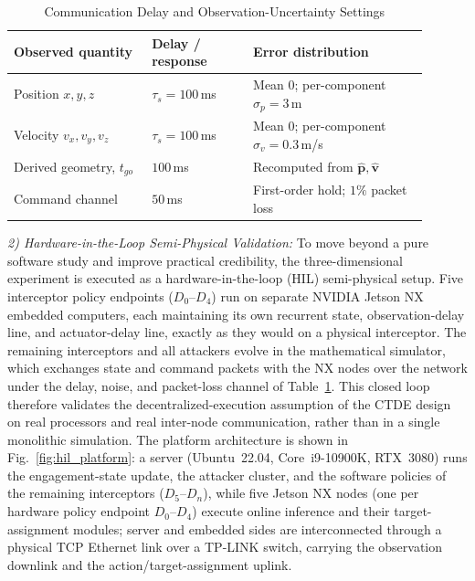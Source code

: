 \documentclass[lettersize,journal]{IEEEtran}
\newcommand{\hladd}[1]{{\color{blue}#1}}
\begin{document}
\begin{table}[!t]
\centering
\caption{\hladd{Communication Delay and Observation-Uncertainty Settings}}
\label{tab:uncertainty_settings}
\renewcommand{\arraystretch}{1.2}
\footnotesize
\begin{tabular}{@{}p{0.30\linewidth}p{0.22\linewidth}p{0.38\linewidth}@{}}
\hline\hline
{\color{blue}Observed quantity} & {\color{blue}Delay / response} & {\color{blue}Error distribution} \\
\hline
{\color{blue}Position $x,y,z$} & {\color{blue}$\tau_s=100$\,ms} & {\color{blue}Mean $0$; per-component $\sigma_p=3$\,m} \\
{\color{blue}Velocity $v_x,v_y,v_z$} & {\color{blue}$\tau_s=100$\,ms} & {\color{blue}Mean $0$; per-component $\sigma_v=0.3$\,m/s} \\
{\color{blue}Derived geometry, $t_{go}$} & {\color{blue}$100$\,ms} & {\color{blue}Recomputed from $\widehat{\mathbf{p}},\widehat{\mathbf{v}}$} \\
{\color{blue}Command channel} & {\color{blue}$50$\,ms} & {\color{blue}First-order hold; $1\%$ packet loss} \\
\hline\hline
\end{tabular}
\end{table}

\hladd{\emph{2) Hardware-in-the-Loop Semi-Physical Validation:} To move beyond a pure software
study and improve practical credibility, the three-dimensional experiment is executed as a
hardware-in-the-loop (HIL) semi-physical setup. Five interceptor policy endpoints ($D_0$--$D_4$)
run on separate NVIDIA Jetson NX embedded computers, each maintaining its own recurrent state,
observation-delay line, and actuator-delay line, exactly as they would on a physical
interceptor. The remaining interceptors and all attackers evolve in the mathematical simulator,
which exchanges state and command packets with the NX nodes over the network under the delay,
noise, and packet-loss channel of Table~\ref{tab:uncertainty_settings}. This closed loop
therefore validates the decentralized-execution assumption of the CTDE design on real
processors and real inter-node communication, rather than in a single monolithic simulation.
The platform architecture is shown in Fig.~\ref{fig:hil_platform}: a server (Ubuntu~22.04,
Core~i9-10900K, RTX~3080) runs the engagement-state update, the attacker cluster, and the
software policies of the remaining interceptors ($D_5$--$D_n$), while five Jetson NX nodes
(one per hardware policy endpoint $D_0$--$D_4$) execute online inference and their target-assignment
modules; server and embedded sides are interconnected through a physical TCP Ethernet link over a
TP-LINK switch, carrying the observation downlink and the action/target-assignment uplink.}
\end{document}
